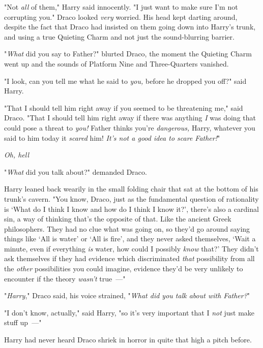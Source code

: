 "Not \emph{all} of them," Harry said innocently. "I just want to make sure I'm
not corrupting you."
\vspace{-0.4cm}
\sbreak
Draco looked \emph{very} worried. His head kept darting around, despite the
fact that Draco had insisted on them going down into Harry's trunk, and using a
true Quieting Charm and not just the sound-blurring barrier.

"\emph{What} did you say to Father?" blurted Draco, the moment the Quieting
Charm went up and the sounds of Platform Nine and Three-Quarters vanished.

"I{\el} look, can you tell me what he said to \emph{you,} before he dropped
you off?" said Harry.

"That I should tell him right away if you seemed to be threatening me," said
Draco. "That I should tell him right away if there was anything \emph{I} was
doing that could pose a threat to \emph{you!} Father thinks you're
\emph{dangerous,} Harry, whatever you said to him today it \emph{scared} him!
\emph{It's not a good idea to scare Father!}"

\emph{Oh, hell{\el}}

"\emph{What} did you talk about?" demanded Draco.

Harry leaned back wearily in the small folding chair that sat at the bottom of
his trunk's cavern. "You know, Draco, just as the fundamental question of
rationality is `What do I think I know and how do I think I know it?', there's
also a cardinal sin, a way of thinking that's the opposite of that. Like the
ancient Greek philosophers. They had no clue what was going on, so they'd go
around saying things like `All is water' or `All is fire', and they never asked
themselves, `Wait a minute, even if everything \emph{is} water, how could I
possibly \emph{know} that?' They didn't ask themselves if they had evidence
which discriminated \emph{that} possibility from all the \emph{other}
possibilities you could imagine, evidence they'd be very unlikely to encounter
if the theory \emph{wasn't} true~---"

"\emph{Harry}," Draco said, his voice strained, "\emph{What did you talk about
with Father?}"

"I don't know, actually," said Harry, "so it's very important that I \emph{not}
just make stuff up~---"

Harry had never heard Draco shriek in horror in quite that high a pitch before.
